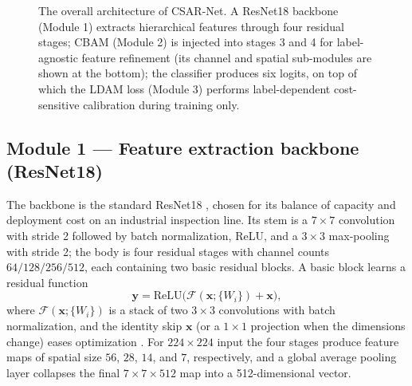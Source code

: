 \documentclass[a4paper,fleqn]{cas-sc}
\begin{document}
\begin{sloppypar}
\begin{figure}[pos=htbp]
{}
		\caption{The overall architecture of CSAR-Net. A ResNet18 backbone (Module 1) extracts hierarchical features through four residual stages; CBAM (Module 2) is injected into stages 3 and 4 for label-agnostic feature refinement (its channel and spatial sub-modules are shown at the bottom); the classifier produces six logits, on top of which the LDAM loss (Module 3) performs label-dependent cost-sensitive calibration during training only.}
		\label{fig:arch}
	\end{figure}

	\subsection{Module 1 --- Feature extraction backbone (ResNet18)}
	\label{sec:backbone}
	\par{
		The backbone is the standard ResNet18 \citep{he2016deep}, chosen for its balance of capacity and deployment cost on an industrial inspection line. Its stem is a $7\times7$ convolution with stride 2 followed by batch normalization, ReLU, and a $3\times3$ max-pooling with stride 2; the body is four residual stages with channel counts $64/128/256/512$, each containing two basic residual blocks. A basic block learns a residual function
		\begin{equation}
			\mathbf{y}=\mathrm{ReLU}\bigl(\mathcal{F}(\mathbf{x};\{W_i\})+\mathbf{x}\bigr),
		\end{equation}
		where $\mathcal{F}(\mathbf{x};\{W_i\})$ is a stack of two $3\times3$ convolutions with batch normalization, and the identity skip $\mathbf{x}$ (or a $1\times1$ projection when the dimensions change) eases optimization \citep{he2016deep}. For $224\times224$ input the four stages produce feature maps of spatial size $56$, $28$, $14$, and $7$, respectively, and a global average pooling layer collapses the final $7\times7\times512$ map into a 512-dimensional vector.
	}


\end{sloppypar}
\end{document}
